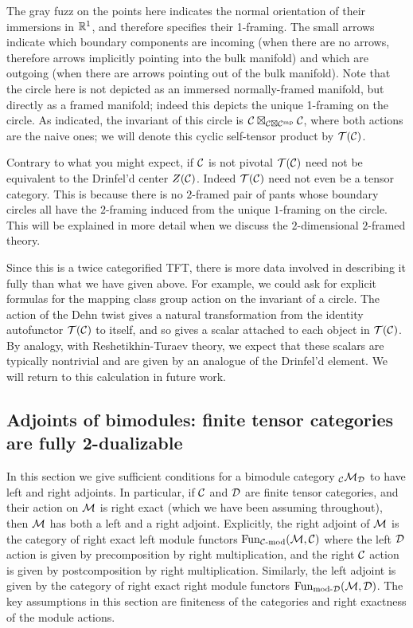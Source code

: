 \documentclass{amsart}
\begin{document}
\nid The gray fuzz on the points here indicates the normal orientation of their immersions in $\mathbb R^1$, and therefore specifies their 1-framing.  The small arrows indicate which boundary components are incoming (when there are no arrows, therefore arrows implicitly pointing into the bulk manifold) and which are outgoing (when there are arrows pointing out of the bulk manifold).  Note that the circle here is not depicted as an immersed normally-framed manifold, but directly as a framed manifold; indeed this depicts the unique 1-framing on the circle.  As indicated, the invariant of this circle is $\mathcal C \boxtimes_{\mathcal C \boxtimes \mathcal C^{\mathrm{mp}}} \mathcal C$, where both actions are the naive ones; we will denote this cyclic self-tensor product by $\mathcal T(\mathcal C)$.

\begin{warning}
Contrary to what you might expect,  if $\mathcal C$ is not pivotal $\mathcal T(\mathcal C)$ need not be equivalent to the Drinfel'd center $Z(\mathcal C)$.  Indeed $\mathcal T(\mathcal C)$ need not even be a tensor category.  This is because there is no $2$-framed pair of pants whose boundary circles all have the $2$-framing induced from the unique $1$-framing on the circle.  This will be explained in more detail when we discuss the $2$-dimensional $2$-framed theory.
\end{warning}

\begin{remark}
Since this is a twice categorified TFT, there is more data involved in describing it fully than what we have given above.  For example, we could ask for explicit formulas for the mapping class group action on the invariant of a circle.  The action of the Dehn twist gives a natural transformation from the identity autofunctor $\mathcal T(\mathcal C)$ to itself, and so gives a scalar attached to each object in $\mathcal T(\mathcal C)$.  By analogy, with Reshetikhin-Turaev theory, we expect that these scalars are typically nontrivial and are given by an analogue of the Drinfel'd element.   We will return to this calculation in future work.
\end{remark} 

\subsection{Adjoints of bimodules: finite tensor categories are fully 2-dualizable}  \label{sec-df-modules}

In this section we give sufficient conditions for a  bimodule category ${}_\mathcal C \mathcal M_\mathcal D$ to have left and right adjoints.  In particular, if $\mathcal C$ and $\mathcal D$ are finite tensor categories, and their action on $\mathcal M$ is right exact (which we have been assuming throughout), then $\mathcal M$ has both a left and a right adjoint.  Explicitly, the right adjoint of $\mathcal M$ is the category of right exact left module functors $\operatorname{Fun}_{{\mathcal C\text{-mod}}}(\mathcal M, \mathcal C)$ where the left $\mathcal D$ action is given by precomposition by right multiplication, and the right $\mathcal C$ action is given by postcomposition by right multiplication.  Similarly, the left adjoint is given by the category of right exact right module functors $\operatorname{Fun}_{\text{mod-}\mathcal D}(\mathcal M, \mathcal D)$.  The key assumptions in this section are finiteness of the categories and right exactness of the module actions.
\end{document}
